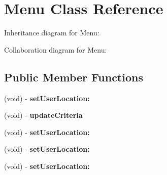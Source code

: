 \hypertarget{interface_menu}{
\section{\-Menu \-Class \-Reference}
\label{interface_menu}
}


\-Inheritance diagram for \-Menu\-:


\-Collaboration diagram for \-Menu\-:
\subsection*{\-Public \-Member \-Functions}
\begin{DoxyCompactItemize}
\item 
\hypertarget{interface_menu_a4e6c5d0617057c845c69237ef3fdf55e}{
(void) -\/ {\bfseries set\-User\-Location\-:}}
\label{interface_menu_a4e6c5d0617057c845c69237ef3fdf55e}

\item 
\hypertarget{interface_menu_a338208cfced3513eaf7ab03104248b8d}{
(void) -\/ {\bfseries update\-Criteria}}
\label{interface_menu_a338208cfced3513eaf7ab03104248b8d}

\item 
\hypertarget{interface_menu_a4e6c5d0617057c845c69237ef3fdf55e}{
(void) -\/ {\bfseries set\-User\-Location\-:}}
\label{interface_menu_a4e6c5d0617057c845c69237ef3fdf55e}

\item 
\hypertarget{interface_menu_a4e6c5d0617057c845c69237ef3fdf55e}{
(void) -\/ {\bfseries set\-User\-Location\-:}}
\label{interface_menu_a4e6c5d0617057c845c69237ef3fdf55e}

\item 
\hypertarget{interface_menu_a4e6c5d0617057c845c69237ef3fdf55e}{
(void) -\/ {\bfseries set\-User\-Location\-:}}
\label{interface_menu_a4e6c5d0617057c845c69237ef3fdf55e}

\end{DoxyCompactItemize}
